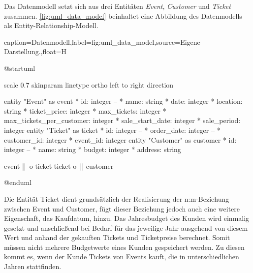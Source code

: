 Das Datenmodell setzt sich aus drei Entitäten \textit{Event}, \textit{Customer} und \textit{Ticket} zusammen.
\autoref{fig:uml_data_model} beinhaltet eine Abbildung des Datenmodells als Entity-Relationship-Modell.

\begin{dhbwfigure}{caption=Datenmodell,label=fig:uml_data_model,source={Eigene Darstellung.},float=H}
    \begin{plantuml}
        @startuml

        scale 0.7
        skinparam linetype ortho
        left to right direction

        entity "Event" as event {
            * id: integer
            --
            * name: string
            * date: integer
            * location: string
            * ticket_price: integer
            * max_tickets: integer
            * max_tickets_per_customer: integer
            * sale_start_date: integer
            * sale_period: integer
        }   
        entity "Ticket" as ticket {
            * id: integer
            --
            * order_date: integer
            --
            * customer_id: integer
            * event_id: integer
        }
        entity "Customer" as customer {
            * id: integer
            --
            * name: string
            * budget: integer
            * address: string
        }

        event ||--o{ ticket
        ticket }o--|| customer

        @enduml
    \end{plantuml}
\end{dhbwfigure}\unskip

Die Entität Ticket dient grundsätzlich der Realisierung der n:m-Beziehung zwischen Event und Customer, fügt dieser Beziehung jedoch auch eine weitere Eigenschaft, das Kaufdatum, hinzu.
Das Jahresbudget des Kunden wird einmalig gesetzt und anschließend bei Bedarf für das jeweilige Jahr ausgehend von diesem Wert und anhand der gekauften Tickets und Ticketpreise berechnet.
Somit müssen nicht mehrere Budgetwerte eines Kunden gespeichert werden. 
Zu diesen kommt es, wenn der Kunde Tickets von Events kauft, die in unterschiedlichen Jahren stattfinden.
